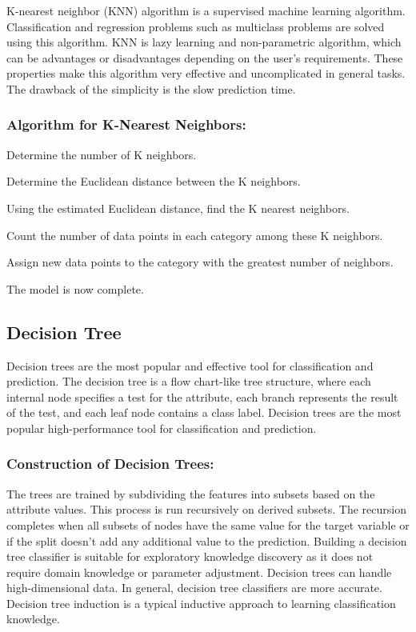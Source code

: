 K-nearest neighbor (KNN) algorithm is a supervised machine learning algorithm. Classification and regression problems such as multiclass problems are solved using this algorithm. KNN is lazy learning and non-parametric algorithm, which can be advantages or disadvantages depending on the user's requirements. These properties make this algorithm very effective and uncomplicated in general tasks. The drawback of the simplicity is the slow prediction time.

\subsubsection{Algorithm for K-Nearest Neighbors:}
\begin{steps}
  \vspace{-0.5em}
  \setlength{\itemsep}{-0.2em}
  \item Determine the number of K neighbors.
  \item Determine the Euclidean distance between the K neighbors.
  \item Using the estimated Euclidean distance, find the K nearest neighbors.
  \item Count the number of data points in each category among these K neighbors.
  \item Assign new data points to the category with the greatest number of neighbors.
  \item The model is now complete.
  \vspace{-1em}
\end{steps}

\subsection{Decision Tree} \label{subsec:decision_tree}
Decision trees are the most popular and effective tool for classification and prediction. The decision tree is a flow chart-like tree structure, where each internal node specifies a test for the attribute, each branch represents the result of the test, and each leaf node contains a class label. Decision trees are the most popular high-performance tool for classification and prediction.

\subsubsection{Construction of Decision Trees:}
\vspace{-0.5em}
The trees are trained by subdividing the features into subsets based on the attribute values. This process is run recursively on derived subsets. The recursion completes when all subsets of nodes have the same value for the target variable or if the split doesn't add any additional value to the prediction. Building a decision tree classifier is suitable for exploratory knowledge discovery as it does not require domain knowledge or parameter adjustment. Decision trees can handle high-dimensional data. In general, decision tree classifiers are more accurate. Decision tree induction is a typical inductive approach to learning classification knowledge.

